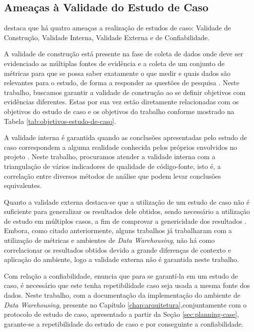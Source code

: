 \subsection{Ameaças à Validade do Estudo de Caso}
\label{sec:validade-estudo}

 destaca que há quatro ameaças a realização de estudos de caso: Validade de Construção, Validade Interna, Validade Externa e de Confiabilidade.

A validade de construção está presente na fase de coleta de dados onde deve ser evidenciado as múltiplas fontes de evidência e a coleta de um conjunto de métricas para que se possa saber exatamente o que medir e quais dados são relevantes para o estudo, de forma a responder as questões de pesquisa \cite{yin2011applications}. Neste trabalho, buscamos garantir a validade de construção ao se definir objetivos com evidências diferentes. Estas por sua vez estão diretamente relacionadas com os objetivos do estudo de caso e os objetivos do trabalho conforme mostrado na Tabela \ref{tab:objetivos-estudo-de-caso}.

A validade interna é garantida quando as conclusões apresentadas pelo estudo de caso correspondem a alguma realidade conhecida pelos próprios envolvidos no projeto \cite{yin2011applications}. Neste trabalho, procuramos atender a validade interna com a triangulação de vários indicadores de qualidade de código-fonte, isto é, a correlação entre diversos métodos de análise que podem levar conclusões equivalentes. 

Quanto a validade externa destaca-se que a utilização de um estudo de caso não é suficiente para generalizar os resultados dele obtidos, sendo necessário a utilização de estudo em múltiplos casos, a fim de comprovar a genericidade dos resultados \cite{yin2011applications}. Embora, como citado anteriormente, alguns trabalhos já trabalharam com a utilização de métricas e ambientes de \textit{Data Warehousing}, não há como correlacionar os resultados obtidos devido a grande diferenças de contexto e aplicação do ambiente, logo a validade externa não é garantida neste trabalho.

Com relação a confiabilidade,  enuncia que para se garantí-la em um estudo de caso, é necessário que este tenha repetibilidade caso seja usada a mesma fonte dos dados. Neste trabalho, com a documentação da implementação do ambiente de \textit{Data Warehousing}, presente no Capítulo \ref{chap:arquitetura},conjuntamente com o protocolo de estudo de caso, apresentado a partir da Seção \ref{sec:planning-case}, garante-se a repetibilidade do estudo de caso e por conseguinte a confiabilidade.

